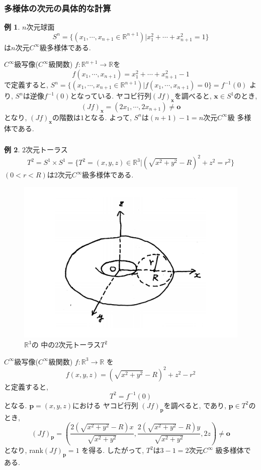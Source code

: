\documentclass[dvipdfmx,cjk]{beamer}
\theoremstyle{definition}
\newtheorem{ex}{\textbf{ 例 }}
\begin{document}
\begin{frame}
  \frametitle{多様体の次元の具体的な計算}
  \begin{ex}
    $n$次元球面
    $$S^n=\{(x_1,\cdots ,x_{n+1}\in 
    \mathbb{R}^{n+1})|x_1^2+\cdots +x_{n+1}^2=1\}$$
    は$n$次元$C^\infty$級多様体である. 
\end{ex}

$C^\infty$級写像($C^\infty$級関数)
$f:\mathbb{R}^{n+1}\to \mathbb{R}$を
$$f(x_1,\cdots ,x_{n+1})=
x_1^2+\cdots +x_{n+1}^2-1$$
で定義すると, 
$S^n=\{(x_1,\cdots ,x_{n+1}\in 
\mathbb{R}^{n+1})|f(x_1,\cdots ,x_{n+1})=0\}
=f^{-1}(0)$
より, $S^n$は逆像$f^{-1}(0)$となっている. 
ヤコビ行列$(Jf)_{\boldsymbol{x}}$を調べると, 
$\boldsymbol{x}\in S^1$のとき, 
$$(Jf)_{\boldsymbol{x}}=(2x_1,\cdots ,2x_{n+1})
\neq \boldsymbol{o}$$
となり, $(Jf)_{\boldsymbol{x}}$の階数は$1$となる. 
よって, $S^n$は$(n+1)-1=n$次元$C^\infty$級
多様体である. 
\end{frame}
\begin{frame}
  \frametitle{}
  \begin{ex}
    $2$次元トーラス
    $$T^2=S^1\times S^1=
    \{T^2=(x,y,z)\in \mathbb{R}^3|
    (\sqrt{x^2+y^2}-R)^2+z^2=r^2\} $$
    $(0<r<R)$は$2$次元$C^\infty$級多様体である. 
    \begin{figure}[H]
      \centering
      \includegraphics[keepaspectratio, scale=0.2]{T2Noshadow.pdf}
      \caption{$\mathbb{R}^3$の
      中の$2$次元トーラス$T^2$}
      \label{T2Noshadow}
     \end{figure}
\end{ex}
\end{frame}
\begin{frame}
    $C^\infty$級写像($C^\infty$級関数)
    $f:\mathbb{R}^3\to \mathbb{R}$
    を
    $$f(x,y,z)=(\sqrt{x^2+y^2}-R)^2+z^2-r^2$$
    と定義すると, 
    $$T^2=f^{-1}(0)$$
    となる. $\boldsymbol{p}=(x,y,z)$における
    ヤコビ行列
    $(Jf)_{\boldsymbol{p}}$を調べると, 
    であり, $\boldsymbol{p}\in T^2$のとき, 
    $$(Jf)_{\boldsymbol{p}}=
    \left(\frac{2(\sqrt{x^2+y^2}-R)x}
        {\sqrt{x^2+y^2}},\frac{2(\sqrt{x^2+y^2}-R)y}
        {\sqrt{x^2+y^2}},2z\right)\neq 
        \boldsymbol{o}$$
    となり, rank$(Jf)_{\boldsymbol{p}}=1$
    を得る. 
    したがって, $T^2$は$3-1=2$次元$C^\infty$
    級多様体である. 
\end{frame}
\end{document}
